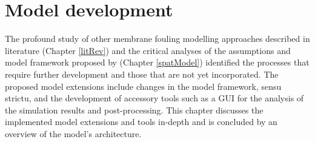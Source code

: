 \hyphenation{}
\chapter[Model development]%
{Model development \label{ModelDev}}
The profound study of other membrane fouling modelling approaches described in literature (Chapter \ref{litRev}) and the critical analyses of the assumptions and model framework proposed by \cite{Ghijs2014} (Chapter \ref{spatModel}) identified the processes that require further development and those that are not yet incorporated. The proposed model extensions include changes in the model framework, sensu strictu, and the development of accessory tools such as a \gls{GUI} for the analysis of the simulation results and post-processing. This chapter discusses the implemented model extensions and tools in-depth and is concluded by an overview of the model's architecture.

